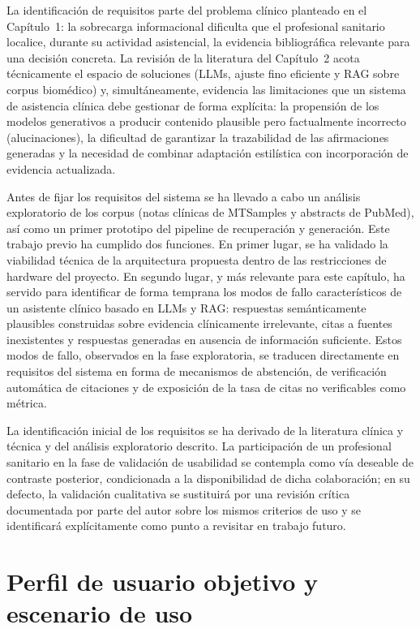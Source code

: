 \documentclass[11pt,a4paper,spanish]{book}
\numberwithin{equation}{chapter}
\numberwithin{figure}{chapter}
\begin{document}
La identificación de requisitos parte del problema clínico planteado en el Capítulo~1: la sobrecarga informacional dificulta que el profesional sanitario localice, durante su actividad asistencial, la evidencia bibliográfica relevante para una decisión concreta. La revisión de la literatura del Capítulo~2 acota técnicamente el espacio de soluciones (LLMs, ajuste fino eficiente y RAG sobre corpus biomédico) y, simultáneamente, evidencia las limitaciones que un sistema de asistencia clínica debe gestionar de forma explícita: la propensión de los modelos generativos a producir contenido plausible pero factualmente incorrecto (alucinaciones), la dificultad de garantizar la trazabilidad de las afirmaciones generadas y la necesidad de combinar adaptación estilística con incorporación de evidencia actualizada.

Antes de fijar los requisitos del sistema se ha llevado a cabo un análisis exploratorio de los corpus (notas clínicas de MTSamples y abstracts de PubMed), así como un primer prototipo del pipeline de recuperación y generación. Este trabajo previo ha cumplido dos funciones. En primer lugar, se ha validado la viabilidad técnica de la arquitectura propuesta dentro de las restricciones de hardware del proyecto. En segundo lugar, y más relevante para este capítulo, ha servido para identificar de forma temprana los modos de fallo característicos de un asistente clínico basado en LLMs y RAG: respuestas semánticamente plausibles construidas sobre evidencia clínicamente irrelevante, citas a fuentes inexistentes y respuestas generadas en ausencia de información suficiente. Estos modos de fallo, observados en la fase exploratoria, se traducen directamente en requisitos del sistema en forma de mecanismos de abstención, de verificación automática de citaciones y de exposición de la tasa de citas no verificables como métrica.

La identificación inicial de los requisitos se ha derivado de la literatura clínica y técnica y del análisis exploratorio descrito. La participación de un profesional sanitario en la fase de validación de usabilidad se contempla como vía deseable de contraste posterior, condicionada a la disponibilidad de dicha colaboración; en su defecto, la validación cualitativa se sustituirá por una revisión crítica documentada por parte del autor sobre los mismos criterios de uso y se identificará explícitamente como punto a revisitar en trabajo futuro.

\section{Perfil de usuario objetivo y escenario de uso}
\end{document}
